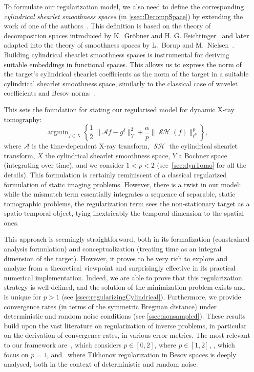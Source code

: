 \documentclass[11pt,a4paper]{article}
\numberwithin{equation}{section}
\DeclareMathOperator*{\argmin}{argmin}
\DeclareMathOperator{\sh}{\mathcal{SH}}
\newcommand{\cA}{\mathscr{A}}
\def\gd{{g}^{\delta}}
\begin{document}
To formulate our regularization model, we also need to  define the corresponding \textit{cylindrical shearlet smoothness spaces}  (in \cref{ssec:DecompSpace}) by extending the work of one of the authors~\cite{labate13}. This definition is based on the theory of decomposition spaces introduced by K.~Gr\"{o}bner and H. G. Feichtinger~\cite{feichtinger1985banach, feichtinger1987banach} and later adapted into the theory of smoothness spaces by L.~Borup and M.~Nielsen~\cite{borup2007frame}. Building cylindrical shearlet smoothness spaces is instrumental for deriving suitable embeddings in functional spaces. This allows us to express the norm of the target's cylindrical shearlet coefficients as the norm of the target in a suitable cylindrical shearlet smoothness space, similarly to the classical case of wavelet coefficients and Besov norms~\cite{daubechies2004}. 

This sets the foundation for stating our regularised model for dynamic X-ray tomography:
\[
\argmin_{f \in X} \left\{
\frac{1}{2} \ \| \cA f 
    - \gd\|^2_{Y} + \frac{\alpha}{p} \| \sh  (f) \|^p_{\ell^p}
\right\},
\]
where $\cA$ is the time-dependent X-ray transform, $\sh$ the cylindrical shearlet transform, $X$ the cylindrical shearlet smoothness space, $Y$ a Bochner space (integrating over time), and we consider $1<p<2$ (see~\cref{sec:dynTomo} for all the details). This formulation is certainly reminiscent of a classical regularized formulation of static imaging problems. However, there is a twist in our model: while the mismatch term essentially integrates a sequence of separable, static tomographic problems, the regularization term sees the non-stationary target as a spatio-temporal object, tying inextricably the temporal dimension to the spatial ones.  

This approach is seemingly straightforward, both in its formalization (constrained analysis formulation) and conceptualization (treating time as an integral dimension of the target). However, it proves to be very rich to explore and analyze from a theoretical viewpoint and surprisingly effective in its practical numerical implementation. Indeed, we are able to prove that this regularization strategy is well-defined, and the solution of the minimization problem exists and is unique for $p>1$ (see \cref{ssec:regularizingCylindrical}). Furthermore, we provide convergence rates (in terms of the symmetric Bregman distance) under deterministic and random noise conditions (see \cref{ssec:nonsampled}). These results build upon the vast literature on regularization of inverse problems, in particular on the derivation of convergence rates, in various error metrics. The most relevant to our framework are~\cite{Lorenz08}, which considers $p \in [0,2]$, \cite{Grasmair08}  where $p \in [1,2]$,  \cite{Burger04,Grasmair11,Grasmair11bis,Haltmeier12}, which focus on $p = 1$, and~\cite{Hohage2019,Weidling2020} where Tikhonov regularization in Besov spaces is deeply analysed, both in the context of deterministic and random noise.
\end{document}
